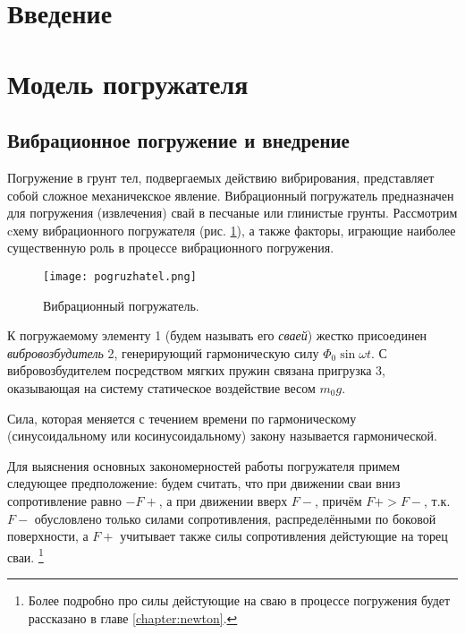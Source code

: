 \section{Введение}

\clearpage

\section{Модель погружателя}

\subsection{Вибрационное погружение и внедрение}

Погружение в грунт тел, подвергаемых действию вибрирования, представляет собой сложное механичекское явление. Вибрационный
погружатель предназначен для погружения (извлечения) свай в песчаные или глинистые грунты. Рассмотрим cхему вибрационного
погружателя (рис. \ref{fig:vp}), а также факторы, играющие наиболее существенную роль в процессе вибрационного погружения.

\begin{figure}[h]
    \centering
    \texttt{[image: pogruzhatel.png]}
    \caption{Вибрационный погружатель.}
    \label{fig:vp}
\end{figure}

\noindent К погружаемому элементу 1 (будем называть его \textit{сваей}) жестко присоединен \textit{вибровозбудитель} 2,
генерирующий гармоническую силу $\Phi_0 \sin \omega t$. С вибровозбудителем посредством мягких пружин связана пригрузка 3,
оказывающая на систему статическое воздействие весом $m_0g$.

\begin{definition}
    Сила, которая меняется с течением времени по гармоническому (синусоидальному или косинусоидальному)
    закону называется гармонической.
\end{definition}

Для выяснения основных закономерностей работы погружателя примем следующее предположение: будем считать, что
при движении сваи вниз сопротивление равно $-F+$, а при движении вверх $F-$, причём $F+ > F-$, т.к. $F-$ обусловлено только
силами сопротивления, распределёнными по боковой поверхности, а $F+$ учитывает также силы сопротивления дейстующие на
торец сваи. \footnote{Более подробно про силы дейстующие на сваю в процессе погружения будет рассказано
в главе \ref{chapter:newton}.}


